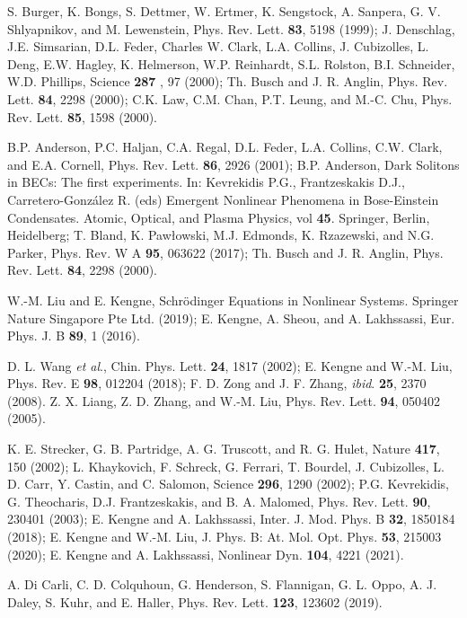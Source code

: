 \documentclass[preprintnumbers]{revtex4}
\begin{document}
\begin{thebibliography}{99}
 S. Burger, K. Bongs, S. Dettmer, W. Ertmer, K. Sengstock, A.
Sanpera, G. V. Shlyapnikov, and M. Lewenstein, Phys. Rev. Lett. \textbf{83},
5198 (1999); J. Denschlag, J.E. Simsarian, D.L. Feder, Charles W. Clark,
L.A. Collins, J. Cubizolles, L. Deng, E.W. Hagley, K. Helmerson, W.P.
Reinhardt, S.L. Rolston, B.I. Schneider, W.D. Phillips, Science \textbf{287}%
, 97 (2000); Th. Busch and J. R. Anglin, Phys. Rev. Lett. \textbf{84}, 2298
(2000); C.K. Law, C.M. Chan, P.T. Leung, and M.-C. Chu, Phys. Rev. Lett.
\textbf{85}, 1598 (2000).

 B.P. Anderson, P.C. Haljan, C.A. Regal, D.L. Feder, L.A.
Collins, C.W. Clark, and E.A. Cornell, Phys. Rev. Lett. \textbf{86}, 2926
(2001); B.P. Anderson, Dark Solitons in BECs: The first experiments. In:
Kevrekidis P.G., Frantzeskakis D.J., Carretero-Gonz\'{a}lez R. (eds)
Emergent Nonlinear Phenomena in Bose-Einstein Condensates. Atomic, Optical,
and Plasma Physics, vol \textbf{45}. Springer, Berlin, Heidelberg; T. Bland,
K. Paw\l owski, M.J. Edmonds, K. Rzazewski, and N.G. Parker, Phys. Rev. W A
\textbf{95}, 063622 (2017); Th. Busch and J. R. Anglin, Phys. Rev. Lett.
\textbf{84}, 2298 (2000).

 W.-M. Liu and E. Kengne, Schr\"{o}dinger Equations in Nonlinear
Systems. Springer Nature Singapore Pte Ltd. (2019); E. Kengne, A. Sheou, and
A. Lakhssassi, Eur. Phys. J. B \textbf{89}, 1 (2016).

 D. L. Wang \textit{et al}., Chin. Phys. Lett. \textbf{24}, 1817
(2002); E. Kengne and W.-M. Liu, Phys. Rev. E \textbf{98}, 012204 (2018); F.
D. Zong and J. F. Zhang, \textit{ibid}. \textbf{25}, 2370 (2008). Z. X.
Liang, Z. D. Zhang, and W.-M. Liu, Phys. Rev. Lett. \textbf{94}, 050402
(2005).

 K. E. Strecker, G. B. Partridge, A. G. Truscott, and R. G.
Hulet, Nature \textbf{417}, 150 (2002); L. Khaykovich, F. Schreck, G.
Ferrari, T. Bourdel, J. Cubizolles, L. D. Carr, Y. Castin, and C. Salomon,
Science \textbf{296}, 1290 (2002); P.G. Kevrekidis, G. Theocharis, D.J.
Frantzeskakis, and B. A. Malomed, Phys. Rev. Lett. \textbf{90}, 230401
(2003); E. Kengne and A. Lakhssassi, Inter. J. Mod. Phys. B \textbf{32},
1850184 (2018); E. Kengne and W.-M. Liu, J. Phys. B: At. Mol. Opt. Phys.
\textbf{53}, 215003 (2020); E. Kengne and A. Lakhssassi, Nonlinear Dyn.
\textbf{104}, 4221 (2021).

 A. Di Carli, C. D. Colquhoun, G. Henderson, S.
Flannigan, G. L. Oppo, A. J. Daley, S. Kuhr, and E. Haller, Phys. Rev. Lett.
\textbf{123}, 123602 (2019).


\end{thebibliography}
\end{document}
